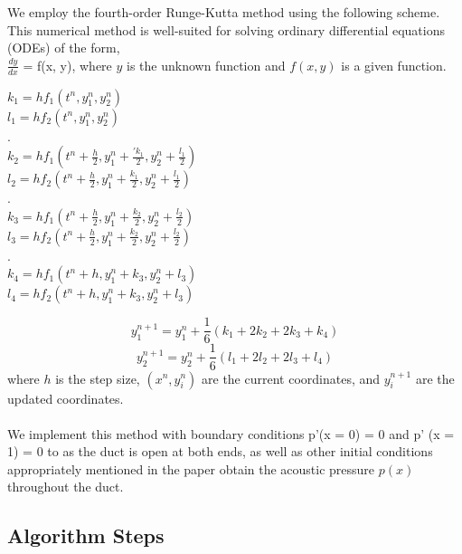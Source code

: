 \documentclass[8pt]{article} %
\begin{document}
We employ the fourth-order Runge-Kutta method using the following scheme. This numerical method is well-suited for solving ordinary differential equations (ODEs) of the form, \\$\frac{dy}{dx}$ = f(x, y),  where \( y \) is the unknown function and \( f(x, y) \) is a given function. 
\begin{center}
    $k_{1} = h f_1(t^{n}, y_{1}^n,y_{2}^n)$ \\
    $ l_1 = h f_2(t^{n}, y_{1}^n,y_{2}^n)$\\
.\\
    $k_{2} = h f_1(t^{n} + \frac{h}{2}, y_{1}^n + \frac{'k_{1}}{2}, y_{2}^n + \frac{l_{1}}{2})$\\
    $ l_2 = h f_2(t^{n} + \frac{h}{2}, y_{1}^n + \frac{k_{1}}{2}, y_{2}^n + \frac{l_{1}}{2})$ \\
.\\
    $k_{3} = h f_1(t^{n} + \frac{h}{2}, y_{1}^n + \frac{k_{2}}{2}, y_{2}^n + \frac{l_{2}}{2}) $\\
    $ l_3 =  h f_2(t^{n} + \frac{h}{2}, y^{n}_1 + \frac{k_{2}}{2}, y_{2}^n + \frac{l_{2}}{2})$ \\
.\\
    $k_{4} = h f_1(t^{n} + h, y_{1}^n + k_{3}, y_{2}^n + l_{3})$\\
    $l_4 = h f_2(t^{n} + h, y_{1}^n + k_{3}, y_{2}^n + l_{3})$ \\
\end{center}
\begin{equation}
    y^{n+1}_1 = y_{1}^n + \frac{1}{6}(k_{1} + 2k_{2} + 2k_{3} + k_{4})
\end{equation}
\begin{equation}
    y^{n+1}_2 = y_{2}^n + \frac{1}{6}(l_{1} + 2l_{2} + 2l_{3} + l_{4})
\end{equation}
where \( h \) is the step size, \( (x^{n}, y_i^{n}) \) are the current coordinates, and \( y_i^{n+1} \) are the updated coordinates.\\\\
We implement this method with boundary conditions  p'(x = 0) = 0 and p' (x = 1) = 0 to as the duct is open at both ends, as well as other initial conditions appropriately mentioned in the paper obtain the acoustic pressure \( p(x) \) throughout the duct.

\subsection{Algorithm Steps}
\end{document}

